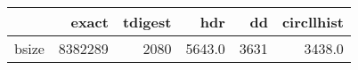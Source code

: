 \begin{tabular}{lrrrrr}
\toprule
{} &    exact &  tdigest &     hdr &    dd &  circllhist \\
\midrule
bsize &  8382289 &     2080 &  5643.0 &  3631 &      3438.0 \\
\bottomrule
\end{tabular}
